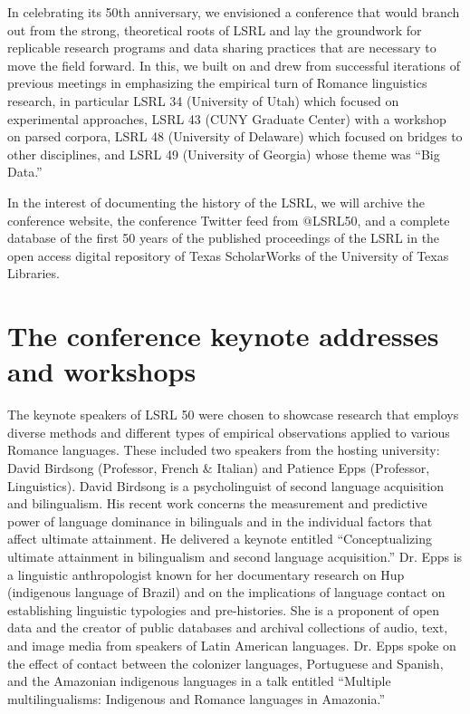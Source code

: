\documentclass[output=paper,draftmode]{langscibook}
\begin{document}
In celebrating its 50th anniversary, we envisioned a conference that would branch out from the strong, theoretical roots of LSRL and lay the groundwork for replicable research programs and data sharing practices that are necessary to move the field forward. In this, we built on and drew from successful iterations of previous meetings in emphasizing the empirical turn of Romance linguistics research, in particular LSRL 34 (University of Utah) which focused on experimental approaches, LSRL 43 (CUNY Graduate Center) with a workshop on parsed corpora, LSRL 48 (University of Delaware) which focused on bridges to other disciplines, and LSRL 49 (University of Georgia) whose theme was “Big Data.”

In the interest of documenting the history of the LSRL, we will archive the conference website, the conference Twitter feed from $@$LSRL50, and a complete database of the first 50 years of the published proceedings of the LSRL in the open access digital repository of Texas ScholarWorks of the University of Texas Libraries.

\section{The conference keynote addresses and workshops}

The keynote speakers of LSRL 50 were chosen to showcase research that employs diverse methods and different types of empirical observations applied to various Romance languages. These included two speakers from the hosting university: David Birdsong (Professor, French \& Italian) and Patience Epps (Professor, Linguistics). David Birdsong is a psycholinguist of second language acquisition and bilingualism. His recent work concerns the measurement and predictive power of language dominance in bilinguals and in the individual factors that affect ultimate attainment. He delivered a keynote entitled “Conceptualizing ultimate attainment in bilingualism and second language acquisition.”  Dr. Epps is a linguistic anthropologist known for her documentary research on Hup (indigenous language of Brazil) and on the implications of language contact on establishing linguistic typologies and pre-histories. She is a proponent of open data and the creator of public databases and archival collections of audio, text, and image media from speakers of Latin American languages. Dr. Epps spoke on the effect of contact between the colonizer languages, Portuguese and Spanish, and the Amazonian indigenous languages in a talk entitled “Multiple multilingualisms: Indigenous and Romance languages in Amazonia.”
\end{document}
